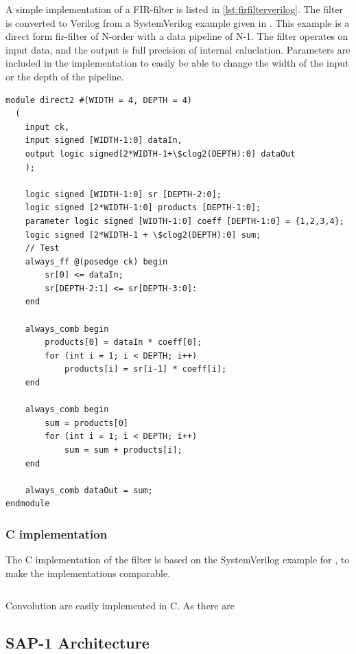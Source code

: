A simple implementation of a FIR-filter is listed in \cref{lst:firfilterverilog}. The filter is converted to Verilog from a SystemVerilog example given in \cite{mehler2014digital}. This example is a direct form \gls{fir}-filter of N-order with a data pipeline of N-1. The filter operates on input data, and the output is full precision of internal caluclation. Parameters are included in the implementation to easily be able to change the width of the input or the depth of the pipeline.

\lstset{language=SystemVerilog, style=Verilogstyle}
\begin{lstlisting}[caption={FIR-filter implemented in Verilog},label=lst:firfilterverilog]
module direct2 #(WIDTH = 4, DEPTH = 4)
  (
	input ck, 
	input signed [WIDTH-1:0] dataIn,
	output logic signed[2*WIDTH-1+\$clog2(DEPTH):0] dataOut
	);
	
	logic signed [WIDTH-1:0] sr [DEPTH-2:0];
	logic signed [2*WIDTH-1:0] products [DEPTH-1:0];
	parameter logic signed [WIDTH-1:0] coeff [DEPTH-1:0] = {1,2,3,4};
	logic signed [2*WIDTH-1 + \$clog2(DEPTH):0] sum;
	// Test
	always_ff @(posedge ck) begin
		sr[0] <= dataIn;
		sr[DEPTH-2:1] <= sr[DEPTH-3:0]:
	end
	
	always_comb begin
		products[0] = dataIn * coeff[0];
		for (int i = 1; i < DEPTH; i++)
			products[i] = sr[i-1] * coeff[i];
	end
	
	always_comb begin
		sum = products[0]
		for (int i = 1; i < DEPTH; i++)
			sum = sum + products[i];
	end
	
	always_comb dataOut = sum;
endmodule
\end{lstlisting}
\subsubsection{C implementation}
The C implementation of the filter is based on the SystemVerilog example for \cite{mehler2014digital}, to make the implementations comparable.
\lstset{language=C,style=Cstyle}
\begin{lstlisting}[caption={FIR-filter implemented in C},label=lst:firfilterc]

\end{lstlisting}

Convolution are easily implemented in C. As there are


\subsection{SAP-1 Architecture}

